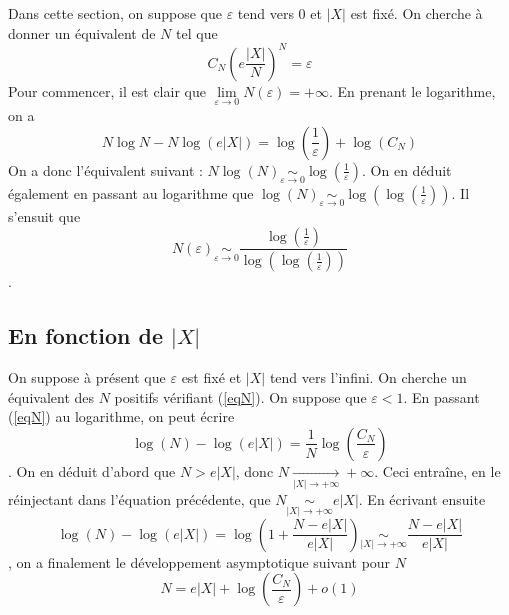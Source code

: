 \documentclass[11pt,a4paper]{article}
\begin{document}
Dans cette section, on suppose que $\varepsilon$ tend vers 0 et $|X|$ est fixé. On cherche à donner un équivalent de $N$ tel que 
\begin{equation}
C_N \left(e\frac{|X|}{N} \right)^N = \varepsilon
\label{eqN}
\end{equation}
Pour commencer, il est clair que $\underset{\varepsilon\to 0}{\lim} N(\varepsilon) = +\infty$. En prenant le logarithme, on a \[N\log N - N\log(e|X|) = \log\left(\frac{1}{\varepsilon}\right) + \log(C_N)\] 
On a donc l'équivalent suivant : 
$N \log(N) \underset{\varepsilon\to 0}{\sim} \log\left(\frac{1}{\varepsilon}\right) $. On en déduit également en passant au logarithme que $\log(N)  \underset{\varepsilon\to 0}{\sim} \log\left(\log\left(\frac{1}{\varepsilon}\right)\right)$. Il s'ensuit que \[ N(\varepsilon)\underset{\varepsilon\to 0}{\sim}\frac{\log\left(\frac{1}{\varepsilon}\right) }{\log\left(\log\left(\frac{1}{\varepsilon}\right)\right)}\]. 

\subsection{En fonction de $|X|$}

On suppose à présent que $\varepsilon$ est fixé et $|X|$ tend vers l'infini. On cherche un équivalent des $N$ positifs vérifiant (\ref{eqN}). On suppose que $\varepsilon < 1$. En passant (\ref{eqN}) au logarithme, on peut écrire \[\log(N) - \log(e|X|) = \frac{1}{N}\log\left(\frac{C_N}{\varepsilon}\right)\]. On en déduit d'abord que $N>e|X|$, donc $N\underset{|X| \to +\infty}{\longrightarrow} +\infty$. Ceci entraîne, en le réinjectant dans l'équation précédente, que $N \underset{|X| \to +\infty}{\sim} e|X|$. En écrivant ensuite \[\log(N) - \log(e|X|) = \log\left(1 + \frac{N-e|X|}{e|X|}\right)\underset{|X| \to +\infty}{\sim} \frac{N-e|X|}{e|X|}\], on a finalement le développement asymptotique suivant pour $N$ \[N = e|X| + \log\left(\frac{C_N}{\varepsilon}\right) + o(1)\]
\end{document}
